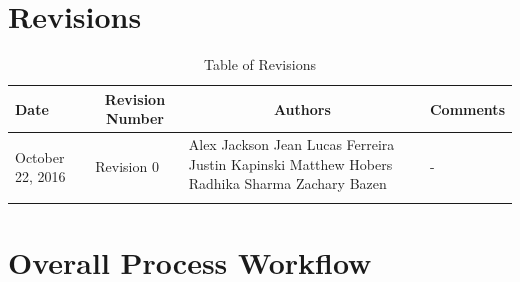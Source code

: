 \documentclass [12pt]{article}
\begin{document}
	
\pagebreak

\tableofcontents
\listoftables

\pagebreak


\section{Revisions}
\begin{longtable}{| p{ } | p{ } | p{ } | p{ } |}

\hline 
\centering \textbf{Date} & 
\multicolumn{1}{c}{\textbf {Revision Number}} &
\multicolumn{1}{|c}{\textbf {Authors}} & 
\multicolumn{1}{|c|}{\textbf {Comments}} \\ \hline

\multirow{4}{*}{\centering October 22, 2016}  & 
\multirow{4}{*}{Revision 0}& 
{Alex Jackson \newline
		Jean Lucas Ferreira \newline
		Justin Kapinski\newline
		Matthew Hobers\newline
		Radhika Sharma\newline
		Zachary Bazen}
 &
\multirow{4}{*}{-} \\ 
\hline 

\caption{Table of Revisions} 
\end{longtable}


 





\pagebreak


\section{Overall Process Workflow}
\end{document}
